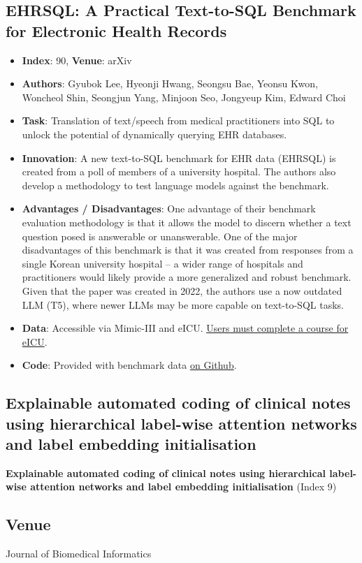 \documentclass[
	letterpaper, %
]{jdf}
\begin{document}
\subsection{EHRSQL: A Practical Text-to-SQL Benchmark for Electronic Health Records}
\begin{itemize}[noitemsep,topsep=0pt,parsep=0pt,partopsep=0pt]
\item \textbf{Index}: 90, \textbf{Venue}: arXiv
\item \textbf{Authors}: Gyubok Lee, Hyeonji Hwang, Seongsu Bae, Yeonsu Kwon, Woncheol Shin, Seongjun Yang, Minjoon Seo, Jongyeup Kim, Edward Choi
\item \textbf{Task}: Translation of text/speech from medical practitioners into SQL to unlock the potential of dynamically querying EHR databases. 
\item \textbf{Innovation}: A new text-to-SQL benchmark for EHR data (EHRSQL) is created from a poll of members of a university hospital. The authors also develop a methodology to test language models against the benchmark. 
\item \textbf{Advantages / Disadvantages}: One advantage of their benchmark evaluation methodology is that it allows the model to discern whether a text question posed is answerable or unanswerable. One of the major disadvantages of this benchmark is that it was created from responses from a single Korean university hospital -- a wider range of hospitals and practitioners would likely provide a more generalized and robust benchmark. Given that the paper was created in 2022, the authors use a now outdated LLM (T5), where newer LLMs may be more capable on text-to-SQL tasks. 
\item \textbf{Data}: Accessible via Mimic-III and eICU. \href{https://physionet.org/content/eicu-crd/2.0/}{Users must complete a course for eICU}.
\item \textbf{Code}: Provided with benchmark data \href{https://github.com/glee4810/EHRSQL}{on Github}.
\end{itemize}

\subsection{Explainable automated coding of clinical notes using hierarchical label-wise attention networks and label embedding initialisation}
\textbf{Explainable automated coding of clinical notes using hierarchical label-wise attention networks and label embedding initialisation} (Index 9)
\subsection{Venue}
Journal of Biomedical Informatics
\end{document}
